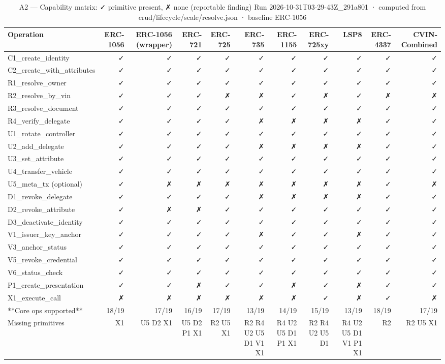 \begin{table}[ht]
\centering
\small
\begin{tabular}{lrrrrrrrrrr}
\toprule
Operation & ERC-1056 & ERC-1056 (wrapper) & ERC-721 & ERC-725 & ERC-735 & ERC-1155 & ERC-725xy & LSP8 & ERC-4337 & CVIN-Combined \\
\midrule
C1\_create\_identity & ✓ & ✓ & ✓ & ✓ & ✓ & ✓ & ✓ & ✓ & ✓ & ✓ \\
C2\_create\_with\_attributes & ✓ & ✓ & ✓ & ✓ & ✓ & ✓ & ✓ & ✓ & ✓ & ✓ \\
R1\_resolve\_owner & ✓ & ✓ & ✓ & ✓ & ✓ & ✓ & ✓ & ✓ & ✓ & ✓ \\
R2\_resolve\_by\_vin & ✓ & ✓ & ✓ & ✗ & ✗ & ✓ & ✗ & ✓ & ✗ & ✗ \\
R3\_resolve\_document & ✓ & ✓ & ✓ & ✓ & ✓ & ✓ & ✓ & ✓ & ✓ & ✓ \\
R4\_verify\_delegate & ✓ & ✓ & ✓ & ✓ & ✗ & ✗ & ✗ & ✗ & ✓ & ✓ \\
U1\_rotate\_controller & ✓ & ✓ & ✓ & ✓ & ✓ & ✓ & ✓ & ✓ & ✓ & ✓ \\
U2\_add\_delegate & ✓ & ✓ & ✓ & ✓ & ✗ & ✗ & ✗ & ✗ & ✓ & ✓ \\
U3\_set\_attribute & ✓ & ✓ & ✓ & ✓ & ✓ & ✓ & ✓ & ✓ & ✓ & ✓ \\
U4\_transfer\_vehicle & ✓ & ✓ & ✓ & ✓ & ✓ & ✓ & ✓ & ✓ & ✓ & ✓ \\
U5\_meta\_tx (optional) & ✓ & ✗ & ✗ & ✗ & ✗ & ✗ & ✗ & ✗ & ✓ & ✗ \\
D1\_revoke\_delegate & ✓ & ✓ & ✓ & ✓ & ✗ & ✗ & ✗ & ✗ & ✓ & ✓ \\
D2\_revoke\_attribute & ✓ & ✗ & ✗ & ✓ & ✓ & ✓ & ✓ & ✓ & ✓ & ✓ \\
D3\_deactivate\_identity & ✓ & ✓ & ✓ & ✓ & ✓ & ✓ & ✓ & ✓ & ✓ & ✓ \\
V1\_issuer\_key\_anchor & ✓ & ✓ & ✓ & ✓ & ✗ & ✓ & ✓ & ✗ & ✓ & ✓ \\
V3\_anchor\_status & ✓ & ✓ & ✓ & ✓ & ✓ & ✓ & ✓ & ✓ & ✓ & ✓ \\
V5\_revoke\_credential & ✓ & ✓ & ✓ & ✓ & ✓ & ✓ & ✓ & ✓ & ✓ & ✓ \\
V6\_status\_check & ✓ & ✓ & ✓ & ✓ & ✓ & ✓ & ✓ & ✓ & ✓ & ✓ \\
P1\_create\_presentation & ✓ & ✓ & ✗ & ✓ & ✓ & ✗ & ✓ & ✗ & ✓ & ✓ \\
X1\_execute\_call & ✗ & ✗ & ✗ & ✗ & ✗ & ✗ & ✓ & ✗ & ✓ & ✗ \\
**Core ops supported** & 18/19 & 17/19 & 16/19 & 17/19 & 13/19 & 14/19 & 15/19 & 13/19 & 18/19 & 17/19 \\
Missing primitives & X1 & U5 D2 X1 & U5 D2 P1 X1 & R2 U5 X1 & R2 R4 U2 U5 D1 V1 X1 & R4 U2 U5 D1 P1 X1 & R2 R4 U2 U5 D1 & R4 U2 U5 D1 V1 P1 X1 & R2 & R2 U5 X1 \\
\bottomrule
\end{tabular}
\caption{A2 — Capability matrix: ✓ primitive present, ✗ none (reportable finding) Run 2026-10-31T03-29-43Z\_291a801 · computed from crud/lifecycle/scale/resolve.json · baseline ERC-1056}
\label{tab:analysis_capabilities}
\end{table}
